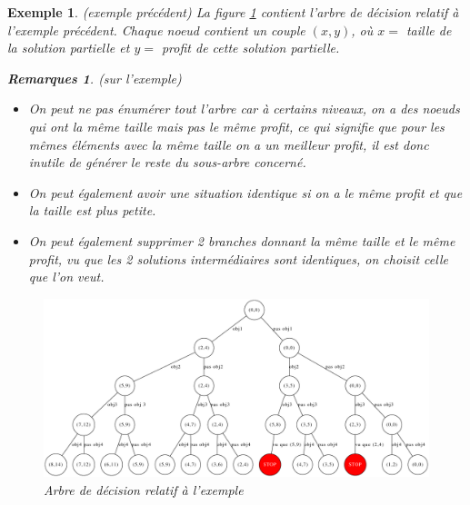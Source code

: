 \documentclass[12pt]{article}
\newtheorem{exemple}{Exemple}[section]
\newtheorem{rems}{Remarques}[section]
\begin{document}
\begin{exemple}(exemple précédent) La figure \ref{bigtree} contient l'arbre de décision relatif à l'exemple précédent. Chaque noeud contient
un couple $(x,y)$, où $x=$ taille de la solution partielle et $y=$ profit de cette solution partielle. \\

\begin{rems}(sur l'exemple)
\begin{itemize}
\item On peut ne pas énumérer tout l'arbre car à certains niveaux, on a des noeuds qui ont la même taille mais pas le même profit, ce qui
signifie que pour les mêmes éléments avec la même taille on a un meilleur profit, il est donc inutile de générer le reste du sous-arbre
concerné.
\item On peut également avoir une situation identique si on a le même profit et que la taille est plus petite.
\item On peut également supprimer 2 branches donnant la même taille et le même profit, vu que les 2 solutions intermédiaires sont identiques,
on choisit celle que l'on veut.
\end{itemize}
\end{rems}

\begin{figure}[h!]
    \begin{center}
    \includegraphics[scale=0.4]{arbredec2.pdf}
    \caption{Arbre de décision relatif à l'exemple}
    \label{bigtree}
    \end{center}
\end{figure}
\end{exemple}
$ $\\
\end{document}
